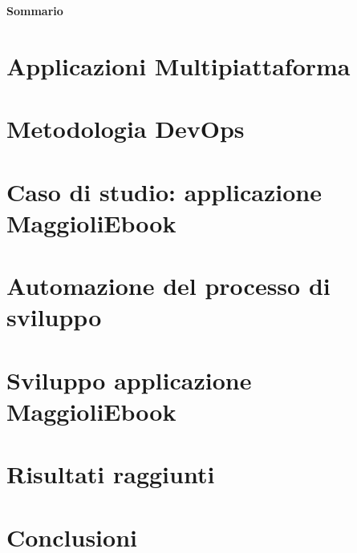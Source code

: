 \documentclass[12pt,a4paper]{report}
\begin{document}
\newpage

\begin{center}
{\LARGE{\bf Sommario}}
\end{center}
{
\noindent

}

\newpage

\tableofcontents

\chapter{Applicazioni Multipiattaforma}
\label{ch:ch1}


\chapter{Metodologia DevOps}
\label{ch:ch2}


\chapter{Caso di studio: applicazione MaggioliEbook}
\label{ch:ch3}


\chapter{Automazione del processo di sviluppo}
\label{ch:ch4}


\chapter{Sviluppo applicazione MaggioliEbook}
\label{ch:ch5}


\chapter{Risultati raggiunti}
\label{ch:ch6}


\chapter{Conclusioni}
\label{ch:ch7}

\end{document}
